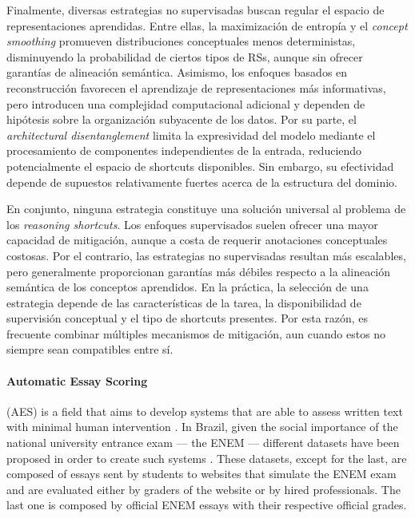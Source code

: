 \documentclass[12pt]{article}
\begin{document}
Finalmente, diversas estrategias no supervisadas buscan regular el espacio de representaciones aprendidas. Entre ellas, la maximización de entropía \cite{Marconato2023-NotAll} y el \textit{concept smoothing} \cite{Yang2024} promueven distribuciones conceptuales menos deterministas, disminuyendo la probabilidad de ciertos tipos de RSs, aunque sin ofrecer garantías de alineación semántica. Asimismo, los enfoques basados en reconstrucción favorecen el aprendizaje de representaciones más informativas, pero introducen una complejidad computacional adicional y dependen de hipótesis sobre la organización subyacente de los datos. Por su parte, el \textit{architectural disentanglement} \cite{Marconato2023-NotAll} limita la expresividad del modelo mediante el procesamiento de componentes independientes de la entrada, reduciendo potencialmente el espacio de shortcuts disponibles. Sin embargo, su efectividad depende de supuestos relativamente fuertes acerca de la estructura del dominio.

En conjunto, ninguna estrategia constituye una solución universal al problema de los \textit{reasoning shortcuts}. Los enfoques supervisados suelen ofrecer una mayor capacidad de mitigación, aunque a costa de requerir anotaciones conceptuales costosas. Por el contrario, las estrategias no supervisadas resultan más escalables, pero generalmente proporcionan garantías más débiles respecto a la alineación semántica de los conceptos aprendidos. En la práctica, la selección de una estrategia depende de las características de la tarea, la disponibilidad de supervisión conceptual y el tipo de shortcuts presentes. Por esta razón, es frecuente combinar múltiples mecanismos de mitigación, aun cuando estos no siempre sean compatibles entre sí.

\paragraph{Automatic Essay Scoring} (AES) is a field that aims to develop systems that are able to assess written text with minimal human intervention \cite{Page-1966}. In Brazil, given the social importance of the national university entrance exam --- the ENEM --- different datasets have been proposed in order to create such systems \cite{amorim-veloso-2017,Essay-br,ExtendedEssay-br,propor2024,paper-lais}. These datasets, except for the last, are composed of essays sent by students to websites that simulate the ENEM exam and are evaluated either by graders of the website or by hired professionals. The last one is composed by official ENEM essays with their respective official grades.
\end{document}
